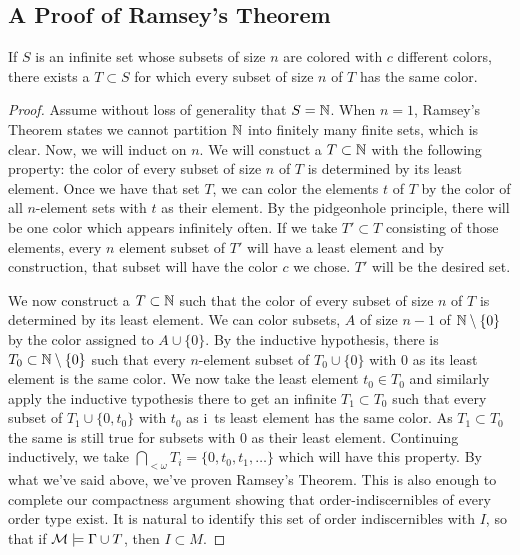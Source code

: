 \subsection{A Proof of Ramsey's Theorem}

\begin{theorem}\label{ramseys_theorem}
If \(S\) is an infinite set whose subsets of size \(n\) are colored with \(c\) different colors, there exists a \(T \subset S\) for which every subset of size \(n\) of \(T\) has the same color.
\end{theorem}

\begin{proof}
Assume without loss of generality that \(S = \mathbb{N}\).
When \(n=1\), Ramsey's Theorem states we cannot partition \(\mathbb{N}\) into finitely many finite sets, which is clear.
Now, we will induct on \(n\).
We will constuct a \(T \subset \mathbb{N}\) with the following property: the color of every subset of size \(n\) of \(T\) is determined by its least element.
Once we have that set \(T\), we can color the elements \(t\) of \(T\) by the color of all \(n\)-element sets with \(t\) as their element.
By the pidgeonhole principle, there will be one color which appears infinitely often.
If we take \(T' \subset T\) consisting of those elements, every \(n\) element subset of \(T'\) will have a least element and by construction, that subset will have the color \(c\) we chose.
\(T'\) will be the desired set.

We now construct a \(T \subset \mathbb{N}\) such that the color of every subset of size \(n\) of \(T\) is determined by its least element.
We can color subsets, \(A\) of size \(n-1\) of \(\mathbb{N} \setminus \{0\}\) by the color assigned to \(A \cup \{0\}\).
By the inductive hypothesis, there is \(T_0 \subset \mathbb{N} \setminus \{0\}\) such that every \(n\)-element subset of \(T_0 \cup \{0\}\) with 0 as its least element is the same color.
We now take the least element \(t_0 \in T_0\) and similarly apply the inductive typothesis there to get an infinite \(T_1 \subset T_0\) such that every subset of \(T_1 \cup \{0, t_0\}\) with \(t_0\) as i\
ts least element has the same color.
As \(T_1 \subset T_0\) the same is still true for subsets with \(0\) as their least element.
Continuing inductively, we take \(\bigcap_{<\omega}T_i = \{0, t_0, t_1, \ldots\}\) which will have this property.
By what we've said above, we've proven Ramsey's Theorem.
This is also enough to complete our compactness argument showing that order-indiscernibles of every order type exist.
It is natural to identify this set of order indiscernibles with \(I\), so that if \(\mathcal{M} \models \Gamma \cup T\), then \(I \subset M\).
\end{proof}


